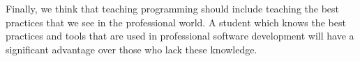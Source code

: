 Finally, we think that teaching programming should include teaching the best practices that we see in the professional world. A student which knows the best practices and tools that are used in professional software development will have a significant advantage over those who lack these knowledge.

